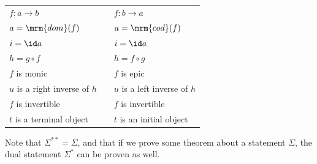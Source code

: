 \documentclass{fkbook}
\renewcommand{\dom}{\mrm{dom}}
\renewcommand{\cod}{\mrm{cod}}
\begin{document}
\begin{adjustwidth}{1em}{1em}
\begin{definition}[Duality]
\begin{table}[H]
\begin{tabular}{@{}lll@{}}
        $f : a \to b$ && $f : b \to a$  \\
        $a = \dom(f)$ && $a = \cod(f)$ \\
        $i = \id a$ && $i = \id a$ \\
        $h = g \circ f$ && $h = f \circ g$ \\
        $f$ is monic && $f$ is epic \\
        $u$ is a right inverse of $h$ && $u$ is a left inverse of $h$
        \\
        $f$ is invertible && $f$ is invertible \\
        $t$ is a terminal object && $t$ is an initial object\\
        \bottomrule
      \end{tabular}
    \end{table}
  \end{definition}
  Note that $\Sigma^{**} = \Sigma$, and that if we prove some theorem
  about a statement $\Sigma$, the dual statement $\Sigma^*$ can be
  proven as well.

\end{adjustwidth}
\end{document}
